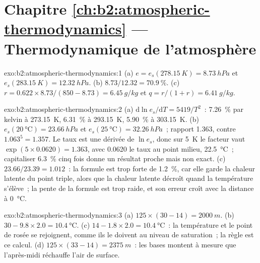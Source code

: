 \section*{Chapitre \ref{ch:b2:atmospheric-thermodynamics} --- Thermodynamique de l'atmosphère}

\begin{solution}{exo:b2:atmospheric-thermodynamics:1}
(a) $e = e_s(\qty{278.15}{K}) = \qty{8.73}{hPa}$ et $e_s(\qty{283.15}{K}) = \qty{12.32}{hPa}$.
(b) $8.73/12.32 = \qty{70.9}{\percent}$. (c) $r = 0.622 \times 8.73/(850 - 8.73) =
\qty{6.45}{g/kg}$ et $q = r/(1 + r) = \qty{6.41}{g/kg}$.
\end{solution}

\begin{solution}{exo:b2:atmospheric-thermodynamics:2}
(a) $\mathrm{d}\ln e_s/\mathrm{d}T = 5419/T^2$~: \qty{7.26}{\percent} par kelvin à
\qty{273.15}{K}, \qty{6.31}{\percent} à \qty{293.15}{K}, \qty{5.90}{\percent} à \qty{303.15}{K}.
(b) $e_s(\qty{20}{\celsius}) = \qty{23.66}{hPa}$ et $e_s(\qty{25}{\celsius})
= \qty{32.26}{hPa}$~; rapport 1.363, contre $1.063^5 = 1.357$. Le taux est une dérivée
de $\ln e_s$, donc sur \qty{5}{K} le facteur vaut $\exp(5 \times 0.0620) = 1.363$, avec
0.0620 le taux au point milieu, \qty{22.5}{\celsius}~; capitaliser \qty{6.3}{\percent}
cinq fois donne un résultat proche mais non exact. (c) $23.66/23.39 = 1.012$~: la
formule est trop forte de \qty{1.2}{\percent}, car elle garde la chaleur latente du point
triple, alors que la chaleur latente décroît quand la température s'élève~; la pente
de la formule est trop raide, et son erreur croît avec la distance à \qty{0}{\celsius}.
\end{solution}

\begin{solution}{exo:b2:atmospheric-thermodynamics:3}
(a) $125 \times (30 - 14) = \qty{2000}{m}$. (b) $30 - 9.8 \times 2.0 = \qty{10.4}{\celsius}$. (c)
$14 - 1.8 \times 2.0 = \qty{10.4}{\celsius}$~: la température et le point de rosée se rejoignent,
comme ils le doivent au niveau de saturation~; la règle est ce calcul. (d)
$125 \times (33 - 14) = \qty{2375}{m}$~: les bases montent à mesure que l'après-midi réchauffe l'air de surface.
\end{solution}

